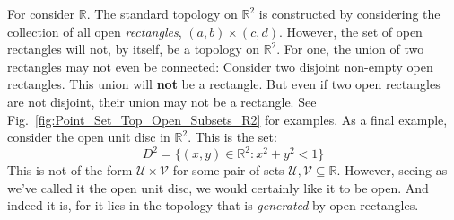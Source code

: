     For consider $\mathbb{R}$. The standard topology
    on $\mathbb{R}^{2}$ is constructed by considering the
    collection of all open \textit{rectangles},
    $(a,b)\times(c,d)$. However, the set of open rectangles
    will not, by itself, be a topology on $\mathbb{R}^{2}$.
    For one, the union of two rectangles may not even be
    connected: Consider two disjoint non-empty open rectangles.
    This union will \textbf{not} be a rectangle.
    But even if two open rectangles are not disjoint,
    their union may not be a rectangle. See
    Fig.~\ref{fig:Point_Set_Top_Open_Subsets_R2} for examples.
    As a final example, consider the open unit disc in
    $\mathbb{R}^{2}$. This is the set:
    \begin{equation}
        D^{2}=\{(x,y)\in\mathbb{R}^{2}:x^{2}+y^{2}<1\}
    \end{equation}
    This is not of the form $\mathcal{U}\times\mathcal{V}$ for
    some pair of sets $\mathcal{U},\mathcal{V}\subseteq\mathbb{R}$.
    However, seeing as we've called it the open unit disc, we
    would certainly like it to be open. And indeed it is, for
    it lies in the topology that is \textit{generated}
    by open rectangles.
